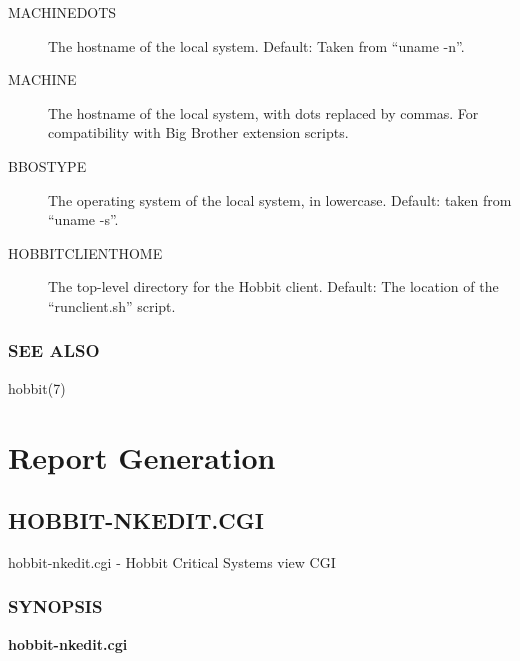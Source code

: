  \begin{description}
\item[MACHINEDOTS] The hostname of the local system. Default: Taken from ``uname -n''. 

 

\item[MACHINE] The hostname of the local system, with dots replaced by
  commas. For compatibility with Big Brother extension scripts. 


 

\item[BBOSTYPE] The operating system of the local system, in lowercase. Default: taken from ``uname -s''. 

 

\item[HOBBITCLIENTHOME] The top-level directory for the Hobbit
  client. Default: The location of the ``runclient.sh'' script. 



\end{description}

\subsection{SEE ALSO}
hobbit(7) 
 


%
\chapter{Report Generation}

%

\newpage
\section{HOBBIT-NKEDIT.CGI}

 hobbit-nkedit.cgi - Hobbit Critical Systems view CGI 

\subsection{SYNOPSIS}
\textbf{hobbit-nkedit.cgi}



